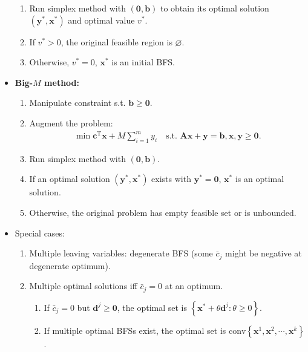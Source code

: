 \documentclass[10pt]{article}
\begin{document}
\begin{multicols*}{3}
\begin{itemize}
\begin{enumerate}
                \item Run simplex method with $(\mathbf{0}, \bm{b})$ to obtain its optimal solution $\left(\bm{y}^*, \bm{x}^*\right)$ and optimal value $v^*$.
                \item If $v^* > 0$, the original feasible region is $\varnothing$.
                \item Otherwise, $v^* = 0$, $\bm{x}^*$ is an initial BFS.
            \end{enumerate} 
            \item \textbf{Big-$M$ method:}
            \begin{enumerate}
                \item Manipulate constraint s.t. $\bm{b} \geq \mathbf{0}$.
                \item Augment the problem:
                \begin{align*}
                    \min \bm{c}^{\mathrm{T}}\bm{x} + M\sum_{i = 1}^{m}y_i \quad \textrm{s.t. } \bm{Ax + y = b}, \bm{x}, \bm{y} \geq \mathbf{0}.
                \end{align*}
                \item Run simplex method with $(\mathbf{0}, \bm{b})$.
                \item If an optimal solution $\left(\bm{y}^*, \bm{x}^*\right)$ exists with $\bm{y}^* = \mathbf{0}$, $\bm{x}^*$ is an optimal solution.
                \item Otherwise, the original problem has empty feasible set or is unbounded.
            \end{enumerate}
            \item Special cases:
            \begin{enumerate}
                \item Multiple leaving variables: degenerate BFS (some $\bar{c}_j$ might be negative at degenerate optimum).
                \item Multiple optimal solutions iff $\bar{c}_j = 0$ at an optimum.
                \begin{enumerate}
                    \item If $\bar{c}_j = 0$ but $\bm{d}^j \geq \mathbf{0}$, the optimal set is $\left\{\bm{x}^* + \theta\bm{d}^j \colon \theta \geq 0\right\}$.
                    \item If multiple optimal BFSs exist, the optimal set is $\mathrm{conv}\left\{\bm{x}^1, \bm{x}^2, \cdots, \bm{x}^k\right\}$.
                \end{enumerate}

\end{enumerate}
\end{itemize}
\end{multicols*}
\end{document}
